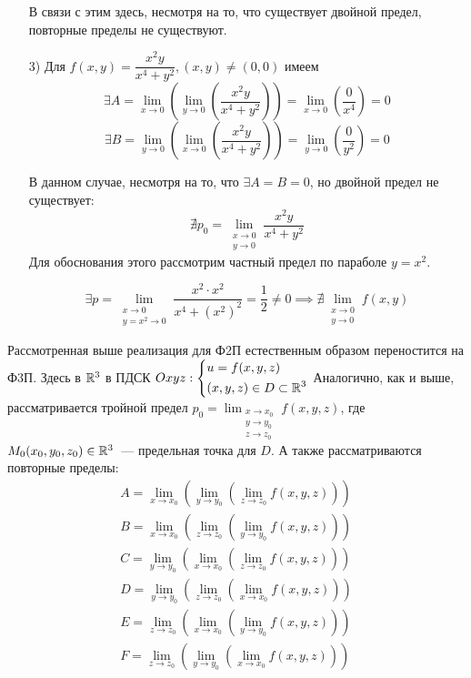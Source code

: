 \documentclass[../../main.tex]{subfiles}
\begin{document}
\begin{itemize}
	В связи с этим здесь, несмотря на то, что существует двойной
	предел, повторные пределы не существуют.
	
	\item[3)] Для $f(x, y) = \dfrac{x^2 y}{x^4 + y^2}, (x, y) \ne (0, 0)$
	имеем \[\exists A = \displaystyle \lim_{x \to 0}
	{(\lim_{y \to 0}{( \dfrac{x^2 y}{x^4 + y^2} )})} =
	\lim_{x \to 0}{\left(\dfrac{0}{x^4}\right)} = 0\]
	\[\exists B = \displaystyle \lim_{y \to 0}
	{(\lim_{x \to 0}{( \dfrac{x^2 y}{x^4 + y^2} )})} =
	\lim_{y \to 0}{\left(\dfrac{0}{y^2}\right)} = 0\]
	
	В данном случае, несмотря на то, что $\exists A = B = 0$, но
	двойной предел не существует:
	\[\nexists p_0 = 
	\lim_{\substack{x \to 0 \\ y \to 0}}{\dfrac{x^2 y}{x^4 + y^2}}\]	
	Для обоснования этого рассмотрим частный предел по параболе
	$y = x^2$.
	
	\[\exists p = \lim_{\substack{x \to 0 \\ y = x^2 \to 0}}
	{\dfrac{x^2 \cdot x^2}{x^4 + (x^2)^2}} = \dfrac{1}{2} \ne 0
	\implies \nexists \lim_{\substack{x \to 0 \\ y \to 0}}{f(x, y)}\]
\end{itemize}


Рассмотренная выше реализация для Ф2П естественным образом
переностится на Ф3П. Здесь в $\mathbb{R}^3$ в ПДСК $Oxyz:
\left\{\begin{aligned}
	&u = f(x, y, z) \\
	&(x, y, z) \in D \subset \mathbb{R}^3	\end{aligned}\right.$
	Аналогично, как и выше, рассматривается тройной предел
	$p_0 = \displaystyle \lim_{\substack{x \to x_0 \\ y \to y_0 \\ z \to z_0}}
{f(x, y, z)}$, где $M_0(x_0, y_0, z_0) \in \mathbb{R}^3$~--- предельная точка для $D$.
А также рассматриваются повторные пределы:
\begin{gather*}
	A = \lim_{x \to x_0}{(\lim_{y \to y_0}{(\lim_{z \to z_0}{f(x, y, z)})})} \\
	B = \lim_{x \to x_0}{(\lim_{z \to z_0}{(\lim_{y \to y_0}{f(x, y, z)})})} \\
	C = \lim_{y \to y_0}{(\lim_{x \to x_0}{(\lim_{z \to z_0}{f(x, y, z)})})} \\
	D = \lim_{y \to y_0}{(\lim_{z \to z_0}{(\lim_{x \to x_0}{f(x, y, z)})})} \\
	E = \lim_{z \to z_0}{(\lim_{x \to x_0}{(\lim_{y \to y_0}{f(x, y, z)})})} \\
	F = \lim_{z \to z_0}{(\lim_{y \to y_0}{(\lim_{x \to x_0}{f(x, y, z)})})}
\end{gather*}
	
\end{document}
